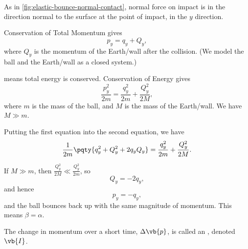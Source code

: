 \begin{example}
    \label{ex:elastic-bounce}%
    As in \autoref{fig:elastic-bounce-normal-contact}, normal force on impact is in the direction normal to the surface at the point of impact, in the \(y\) direction.
    
    Conservation of Total Momentum gives
    \begin{equation}
        p_y = q_y + Q_y,
    \end{equation}
    where \(Q_y\) is the momentum of the Earth/wall after the collision. (We model the ball and the Earth/wall as a closed system.)

     means total energy is conserved. Conservation of Energy gives
    \begin{equation}
        \frac{p_y^2}{2m} = \frac{q_y^2}{2m} + \frac{Q_y^2}{2M},
    \end{equation}
    where \(m\) is the mass of the ball, and \(M\) is the mass of the Earth/wall. We have \(M \gg m\).

    Putting the first equation into the second equation, we have
    \begin{equation}
        \frac{1}{2m} \pqty{q_y^2 + Q_y^2 + 2 q_y Q_y} = \frac{q_y^2}{2m} + \frac{Q_y^2}{2M}.
    \end{equation}

    If \(M \gg m\), then \(\frac{Q_y^2}{2M} \ll \frac{Q_y^2}{2m}\), so
    \begin{equation}
        Q_y = - 2 q_y,
    \end{equation}
    and hence
    \begin{equation}
        \boxed{p_y = - q_y},
    \end{equation}
    and the ball bounces back up with the same magnitude of momentum. This means \(\beta = \alpha\).
\end{example}

\begin{definition}[Impulse]
    \label{def:impulse}%
    The change in momentum over a short time, \(\Delta \vb{p}\), is called an , denoted \(\vb{I}\).
\end{definition}
